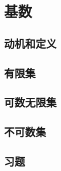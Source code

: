 \section{基数}

\subsection{动机和定义}

\subsection{有限集}

\subsection{可数无限集}\label{sec:section7.6.3}

\subsection{不可数集}

\subsection{习题}